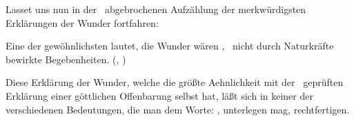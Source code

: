 Lasset uns nun in der \ abgebrochenen Aufzählung der merkwürdigsten Erklärungen der Wunder fortfahren:
\begin{aufza}\setcounter{enumi}{3}
\item Eine der gewöhnlichsten lautet, die Wunder wären , \dh\ nicht durch Naturkräfte bewirkte Begebenheiten. (, \uvA)
\end{aufza}\par
Diese Erklärung der Wunder, welche die größte Aehnlichkeit mit der \ geprüften Erklärung einer göttlichen Offenbarung selbst hat, läßt sich in keiner der verschiedenen Bedeutungen, die man dem Worte: , unterlegen mag, rechtfertigen.
